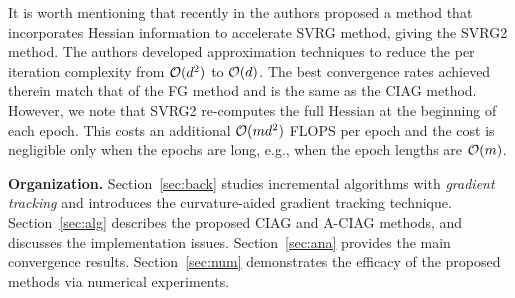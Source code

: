 \documentclass[smallextended]{svjour3}       %
\begin{document}
It is worth mentioning that recently in \cite{gower2017tracking}
the authors proposed a method that incorporates
Hessian information to accelerate 
{\sf SVRG} method, giving the {\sf SVRG2} method. 
The authors developed approximation techniques to reduce the per iteration complexity 
from ${\cal O}(d^2)$ to ${\cal O}(d)$. 
The best convergence rates achieved therein
match that of the {\sf FG} method and is the same as the {\sf CIAG} method.
However, we note that {\sf SVRG2} re-computes the full Hessian
at the beginning of each epoch. This costs an additional ${\cal O}(m d^2)$ FLOPS per epoch
and the cost  is negligible only when the epochs are long, e.g., when the 
epoch lengths are ${\cal O}(m)$. 

 
\vspace{.2cm}
\noindent \textbf{Organization.}  Section~\ref{sec:back} studies 
incremental algorithms with \emph{gradient tracking} and introduces the curvature-aided gradient tracking technique. Section~\ref{sec:alg}
describes the proposed {\sf CIAG} and {\sf A-CIAG} methods, and discusses the  implementation issues.
Section~\ref{sec:ana} provides the main convergence results. 
Section~\ref{sec:num} demonstrates the efficacy of 
the proposed methods via numerical experiments. 
 
\end{document}
